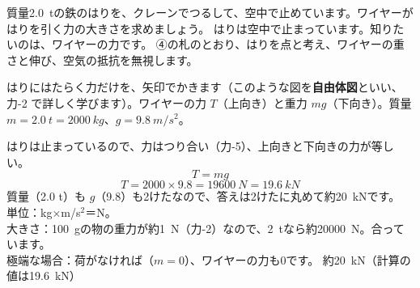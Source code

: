 \begin{phreidai}[止まった荷をつるすワイヤー]\label{ph:力-0:ex1}
質量\qty{2.0}{t}の鉄のはりを、クレーンでつるして、空中で止めています。ワイヤーがはりを引く力の大きさを求めましょう。
\phbamen
はりは空中で止まっています。知りたいのは、ワイヤーの力です。
\phmushi
④の札のとおり、はりを点と考え、ワイヤーの重さと伸び、空気の抵抗を無視します。
\phzu
\noindent\begin{minipage}[c]{0.3\linewidth}\centering
{}
\end{minipage}\hfill
\begin{minipage}[c]{0.68\linewidth}
はりにはたらく力だけを、矢印でかきます（このような図を\textbf{自由体図}といい、力-2 で詳しく学びます）。ワイヤーの力 $T$（上向き）と重力 $mg$（下向き）。質量 $m=\qty{2.0}{t}=\qty{2000}{kg}$、$g=\qty{9.8}{m/s^2}$。
\end{minipage}
\phriyu
はりは止まっているので、力はつり合い（力-5）、上向きと下向きの力が等しい。
\phtateru
\[T=mg\]
\phtoku
\[T=2000\times9.8=\qty{19600}{N}=\qty{19.6}{kN}\]
質量（2.0 t）も $g$（9.8）も2けたなので、答えは2けたに丸めて約\qty{20}{kN}です。
\phtashikame
単位：kg×m/s$^2$＝N。\\
大きさ：\qty{100}{g}の物の重力が約\qty{1}{N}（力-2）なので、\qty{2}{t}なら約\qty{20000}{N}。合っています。\\
極端な場合：荷がなければ（$m=0$）、ワイヤーの力も0です。
\kotae 約\qty{20}{kN}（計算の値は\qty{19.6}{kN}）
\end{phreidai}

